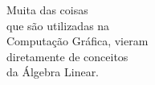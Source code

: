 \documentclass[preview]{standalone}
\begin{document}
\begin{center}
Muita das coisas\\que são utilizadas na\\Computação Gráfica, vieram\\diretamente de conceitos\\da Álgebra Linear.
\end{center}
\end{document}
